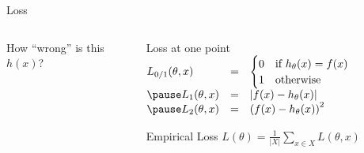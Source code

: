 \documentclass[14pt]{beamer}
\begin{document}
\begin{frame}[label=loss]{Loss}
\begin{columns}
\begin{column}{0.43\textwidth}
How ``wrong'' is this $h(x)$?\\[1em]
\end{column}
\pause
\begin{column}{0.55\textwidth}
\setlength{\arraycolsep}{0.1em}
\renewcommand{\arraystretch}{1.75}
\begin{block}{Loss at one point}
$\begin{array}{@{} l l l @{}}
L_{0/1}(\theta, x) & = &
\begin{cases}
0 & \text{if } h_{\theta}(x) = f(x) \\
1 & \text{otherwise}
\end{cases}
\\
\pause L_1(\theta, x) & = & \left| f(x) - h_{\theta}(x) \right| \\
\pause L_2(\theta, x) & = & \left( f(x) - h_{\theta}(x) \right)^2
\end{array}$
\end{block}
\pause
\begin{block}{Empirical Loss}
$\displaystyle L(\theta) = \frac{1}{|X|} \sum_{x \in X} L(\theta, x)$
\end{block}
\end{column}
\end{columns}
\end{frame}
\end{document}
